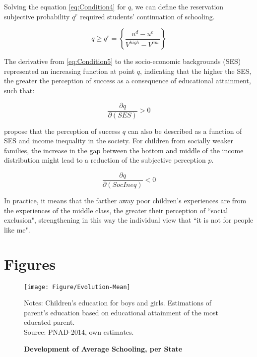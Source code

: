 \documentclass[a4paper, 12pt]{article}
\begin{document}
Solving the equation \eqref{eq:Condition4} for $q$, we can define the reservation subjective probability $q^r$ required students’ continuation of schooling.


\begin{equation} \label{eq:Condition5} 
q \geq q^r = \left \{ \frac{u^d - u^e}{V^{high} - V^{low}} \right \}
\end{equation}

The derivative from \eqref{eq:Condition5} to the socio-economic backgrounds (SES) represented an increasing function at point $q$, indicating that the higher the SES, the greater the perception of success as a consequence of educational attainment, such that:


\begin{equation} \label{eq:Condition6}
\frac{\partial q}{\partial (SES)} > 0
\end{equation}

\citet{kearney2014income} propose that the perception of success $q$ can also be described as a function of SES and income inequality in the society. For children from socially weaker families, the increase in the gap between the bottom and middle of the income distribution might lead to a reduction of the subjective perception $p$.


\begin{equation} \label{eq:Condition7}
\frac{\partial q}{\partial (SocIneq)} < 0
\end{equation}

In practice, it means that the farther away poor children’s experiences are from the experiences of the middle class, the greater their perception of “social exclusion", strengthening in this way the individual view that “it is not for people like me".







\newpage
\section{Figures}
\label{appendix:Figures}

\begin{figure}[H]
\centering
    \texttt{[image: Figure/Evolution-Mean]}
    \label{fig:Evolution-Mean} 
\begin{minipage}{0.8\textwidth} %
{\scriptsize
Notes: Children's education for boys and girls. Estimations of parent's education based on educational attainment of the most educated parent.\\ Source: PNAD-2014, own estimates.\par}
\end{minipage}
\captionsetup{justification=centering,margin=2cm}
\caption{\textbf{Development of Average Schooling, per State}}
\end{figure}
\end{document}
